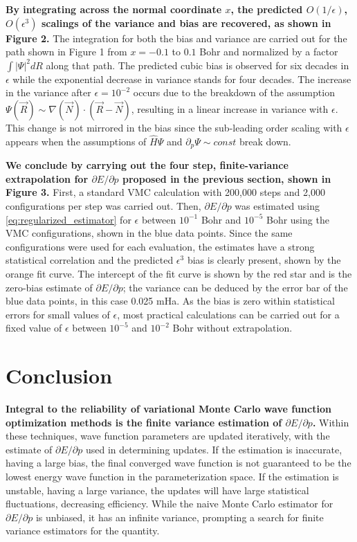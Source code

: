 \documentclass{article}
\begin{document}
\textbf{By integrating across the normal coordinate $x$, the predicted $O(1/\epsilon)$, $O(\epsilon^3)$ scalings of the variance and bias are recovered, as shown in Figure 2.} 
The integration for both the bias and variance are carried out for the path shown in Figure 1 from $x = -0.1$ to $0.1$ Bohr and normalized by a factor $\int |\Psi|^2 dR$ along that path.
The predicted cubic bias is observed for six decades in $\epsilon$ while the exponential decrease in variance stands for four decades.
The increase in the variance after $\epsilon = 10^{-2}$ occurs due to the breakdown of the assumption $\Psi(\vec{R}) \sim \nabla(\vec{N}) \cdot (\vec{R}-\vec{N})$, resulting in a linear increase in variance with $\epsilon$.
This change is not mirrored in the bias since the sub-leading order scaling with $\epsilon$ appears when the assumptions of $\hat{H}\Psi$ and $\partial_p \Psi \sim const$ break down.

\textbf{We conclude by carrying out the four step, finite-variance extrapolation for $\partial E/\partial p$ proposed in the previous section, shown in Figure 3.}
First, a standard VMC calculation with 200,000 steps and 2,000 configurations per step was carried out.
Then, $\partial E/\partial p$ was estimated using \eqref{eq:regularized_estimator} for $\epsilon$ between $10^{-1}$ Bohr and $10^{-5}$ Bohr using the VMC configurations, shown in the blue data points.
Since the same configurations were used for each evaluation, the estimates have a strong statistical correlation and the predicted $\epsilon^3$ bias is clearly present, shown by the orange fit curve.
The intercept of the fit curve is shown by the red star and is the zero-bias estimate of $\partial E/\partial p$; the variance can be deduced by the error bar of the blue data points, in this case 0.025 mHa.
As the bias is zero within statistical errors for small values of $\epsilon$, most practical calculations can be carried out for a fixed value of $\epsilon$ between $10^{-5}$ and $10^{-2}$ Bohr without extrapolation.

\section{Conclusion}
\textbf{Integral to the reliability of variational Monte Carlo wave function optimization methods is the finite variance estimation of $\partial E/\partial p$.}
Within these techniques, wave function parameters are updated iteratively, with the estimate of $\partial E/\partial p$ used in determining updates.
If the estimation is inaccurate, having a large bias, the final converged wave function is not guaranteed to be the lowest energy wave function in the parameterization space.
If the estimation is unstable, having a large variance, the updates will have large statistical fluctuations, decreasing efficiency.
While the naive Monte Carlo estimator for $\partial E/\partial p$ is unbiased, it has an infinite variance, prompting a search for finite variance estimators for the quantity.
\end{document}
